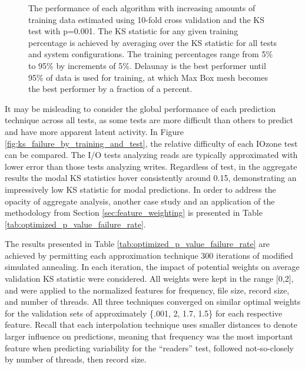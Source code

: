 \documentclass[letterpaper, 10 pt, conference]{ieeeconf}  %
\begin{document}
\begin{figure}
  \caption{The performance of each algorithm with increasing amounts of training data estimated using 10-fold cross validation and the KS test with p=0.001. The KS statistic for any given training percentage is achieved by averaging over the KS statistic for all tests and system configurations. The training percentages range from 5\% to 95\% by increments of 5\%. Delaunay is the best performer until 95\% of data is used for training, at which Max Box mesh becomes the best performer by a fraction of a percent.
  \vspace{-.1cm}}
  \label{fig:ks_failure_by_training}
\end{figure}

It may be misleading to consider the global performance of each prediction technique across all tests, as some tests are more difficult than others to predict and have more apparent latent activity. In Figure \ref{fig:ks_failure_by_training_and_test}, the relative difficulty of each IOzone test can be compared. The I/O tests analyzing reads are typically approximated with lower error than those tests analyzing writes. Regardless of test, in the aggregate results the modal KS statistics hover consistently around 0.15, demonstrating an impressively low KS statistic for modal predictions. In order to address the opacity of aggregate analysis, another case study and an application of the methodology from Section \ref{sec:feature_weighting} is presented in Table \ref{tab:optimized_p_value_failure_rate}.

The results presented in Table \ref{tab:optimized_p_value_failure_rate} are achieved by permitting each approximation technique 300 iterations of modified simulated annealing. In each iteration, the impact of potential weights on average validation KS statistic were considered. All weights were kept in the range [0,2], and were applied to the normalized features for frequency, file size, record size, and number of threads. All three techniques converged on similar optimal weights for the validation sets of approximately \{.001, 2, 1.7, 1.5\} for each respective feature. Recall that each interpolation technique uses smaller distances to denote larger influence on predictions, meaning that frequency was the most important feature when predicting variability for the ``readers'' test, followed not-so-closely by number of threads, then record size.
\end{document}
